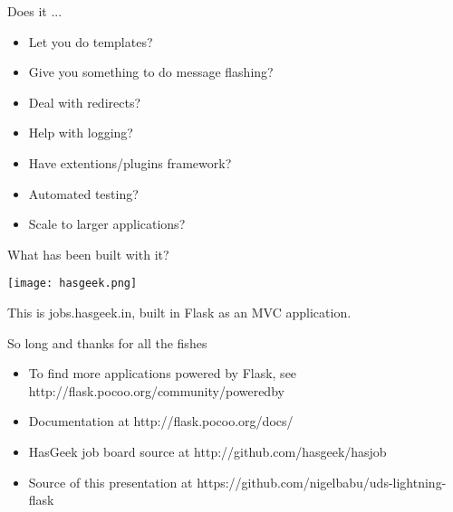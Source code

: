 \documentclass[xcolor=dvipsnames]{beamer}
\begin{document}
    \begin{frame}{Does it ...}
        \begin{itemize}
            \pause \item Let you do templates?
            \pause \item Give you something to do message flashing?
            \pause \item Deal with redirects?
            \pause \item Help with logging?
            \pause \item Have extentions/plugins framework?
            \pause \item Automated testing?
            \pause \item Scale to larger applications?
        \end{itemize}
    \end{frame}

    \begin{frame}{What has been built with it?}
        \begin{center}
	    \texttt{[image: hasgeek.png]}
	    \label{fig:hasgeek}
        \end{center}
        This is jobs.hasgeek.in, built in Flask as an MVC application.
    \end{frame}

    \begin{frame}{So long and thanks for all the fishes}
        \Large
        \begin{itemize}
            \item To find more applications powered by Flask, see http://flask.pocoo.org/community/poweredby
            \item Documentation at http://flask.pocoo.org/docs/
            \item HasGeek job board source at http://github.com/hasgeek/hasjob
            \item Source of this presentation at https://github.com/nigelbabu/uds-lightning-flask
        \end{itemize}
    \end{frame}
\end{document}
